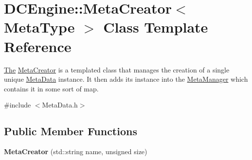 \hypertarget{classDCEngine_1_1MetaCreator}{\section{D\-C\-Engine\-:\-:Meta\-Creator$<$ Meta\-Type $>$ Class Template Reference}
\label{classDCEngine_1_1MetaCreator}
}


\hyperlink{classThe}{The} \hyperlink{classDCEngine_1_1MetaCreator}{Meta\-Creator} is a templated class that manages the creation of a single unique \hyperlink{classDCEngine_1_1MetaData}{Meta\-Data} instance. It then adds its instance into the \hyperlink{classDCEngine_1_1MetaManager}{Meta\-Manager} which contains it in some sort of map.  




{\ttfamily \#include $<$Meta\-Data.\-h$>$}

\subsection*{Public Member Functions}
\begin{DoxyCompactItemize}
\item 
\hypertarget{classDCEngine_1_1MetaCreator_a289d26fa24a86d49292583bdcb583d0a}{{\bfseries Meta\-Creator} (std\-::string name, unsigned size)}\label{classDCEngine_1_1MetaCreator_a289d26fa24a86d49292583bdcb583d0a}

\end{DoxyCompactItemize}
